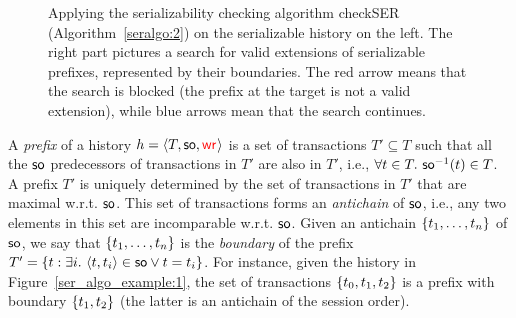\begin{figure}
\begin{subfigure}{.19\textwidth}
{\begin{tikzpicture}[->,>=stealth',shorten >=1pt,auto,node distance=3cm,
       semithick, transform shape]
      
     \end{tikzpicture}  
    }
    \caption{ }
    \label{ser_algo_example:3}
   \end{subfigure}
   \vspace{-4mm}
  \caption{Applying the serializability checking algorithm \textsf{checkSER} (Algorithm~\ref{seralgo:2}) on the serializable history on the left. The right part pictures a search for valid extensions of serializable prefixes, represented by their boundaries. The red arrow means that the search is blocked (the prefix at the target is not a valid extension), while blue arrows mean that the search continues.}
  \label{ser_algo_example}
  \vspace{-4mm}
\end{figure}

A \emph{prefix} of a history $\hist = \tup{T, \so, \wro}$ is a set of transactions $T'\subseteq T$ such that all the $\so$ predecessors of transactions in $T'$ are also in $T'$, i.e., $\forall \tr\in T.\ \so^{-1}(\tr)\in T$. A prefix $T'$ is uniquely determined by the set of transactions in $T'$ that are maximal w.r.t. $\so$. This set of transactions forms an \emph{antichain} of $\so$, i.e., any two elements in this set are incomparable w.r.t. $\so$. Given an antichain $\{\tr_1,\ldots,\tr_n\}$ of $\so$, we say that $\{\tr_1,\ldots,\tr_n\}$ is the \emph{boundary} of the prefix $T'=\{t:\exists i.\ \tup{t,t_i}\in \so\lor t = t_i\}$. For instance, given the history in Figure~\ref{ser_algo_example:1}, the set of transactions $\{\tr_0,\tr_1,\tr_2\}$ is a prefix with boundary $\{\tr_1,\tr_2\}$ (the latter is an antichain of the session order).

